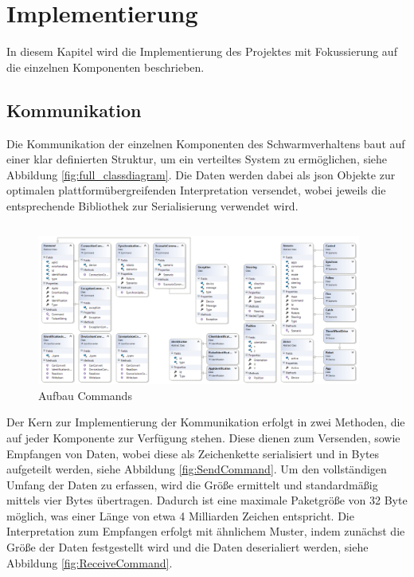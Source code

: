 \section{Implementierung}

In diesem Kapitel wird die Implementierung des Projektes mit Fokussierung auf die einzelnen Komponenten beschrieben.

\subsection{Kommunikation}

Die Kommunikation der einzelnen Komponenten des Schwarmverhaltens baut auf einer klar definierten Struktur, um ein verteiltes System zu ermöglichen, siehe Abbildung \eqref{fig:full_classdiagram}. Die Daten werden dabei als \gls{json} Objekte zur optimalen plattformübergreifenden Interpretation versendet, wobei jeweils die entsprechende Bibliothek zur Serialisierung verwendet wird.
\begin{verbatim}
\end{verbatim}
\begin{figure}[h]
	\begin{center}
		\includegraphics[width=0.95\textwidth]{images/uml/full_class_diagram.png}
	\end{center}
	\caption{Aufbau Commands}
	\label{fig:full_classdiagram}
\end{figure}

\newpage
\noindent
Der Kern zur Implementierung der Kommunikation erfolgt in zwei Methoden, die auf jeder Komponente zur Verfügung stehen. Diese dienen zum Versenden, sowie Empfangen von Daten, wobei diese als Zeichenkette serialisiert und in Bytes aufgeteilt werden, siehe Abbildung \ref{fig:SendCommand}. Um den vollständigen Umfang der Daten zu erfassen, wird die Größe ermittelt und standardmäßig mittels vier Bytes übertragen. Dadurch ist eine maximale Paketgröße von 32 Byte möglich, was einer Länge von etwa 4 Milliarden Zeichen entspricht. Die Interpretation zum Empfangen erfolgt mit ähnlichem Muster, indem zunächst die Größe der Daten festgestellt wird und die Daten deserialiert werden, siehe Abbildung \ref{fig:ReceiveCommand}.

